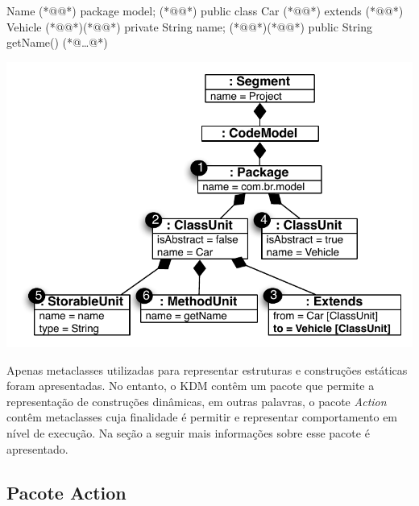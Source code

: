\noindent\begin{minipage}{.53\textwidth}
	\begin{codigo}[caption={[Parte de código Java para ilustrar como o KDM é usado para representar o código fonte.] Simples código em java.},escapeinside={(*@}{@*)}, basicstyle=\footnotesize, label={lst:example_kdm_instance}]{Name}
	(*@@*) package model;
	(*@@*) public class Car (*@@*) extends  
	(*@@*) Vehicle{
	(*@@*)(*@@*) private String name;
	(*@@*)(*@@*) public String getName(){
	(*@\ldots @*)
	}
	}
	\end{codigo}
\end{minipage}\hfill
\begin{minipage}{.45\textwidth}
	\centering
	\includegraphics[scale=0.6]{images/kdm_instance_java_correspoding_2_with_extends}
	\label{fig:kdm_instance_Java}
\end{minipage}


Apenas metaclasses utilizadas para representar estruturas e construções estáticas foram apresentadas. No entanto, o KDM contêm um pacote que permite a representação de construções dinâmicas, em outras palavras, o pacote \textit{Action} contêm metaclasses cuja finalidade é permitir e representar comportamento em nível de execução. Na seção a seguir mais informações sobre esse pacote é apresentado.

\subsection{Pacote Action}\label{sec:actionPackage}

